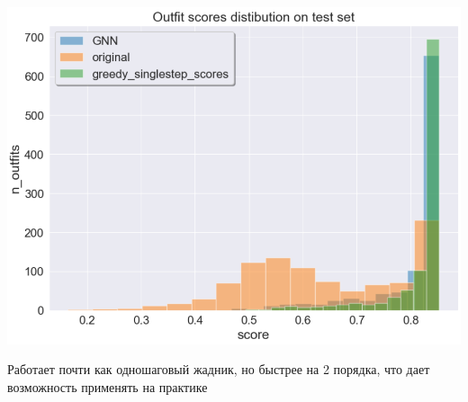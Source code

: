 \documentclass[a4paper,12pt]{article}
\begin{document}
					\includegraphics[scale = 0.7]{../figures/GNN_at_least_5_subset1000_test.png}
										
					Работает почти как одношаговый жадник, но быстрее на 2 порядка, что дает возможность применять на практике
					
					
					
					
			
			
			
			
			
			
			
	
	
			
	 
\end{document}
